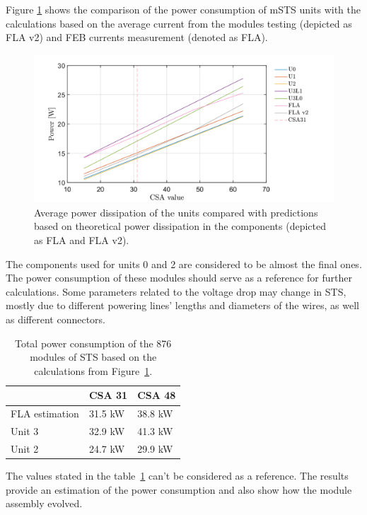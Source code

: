 Figure \ref{fig_theor} shows the comparison of the power consumption of \gls{mSTS} units with the calculations based on the average current from the modules testing (depicted as FLA v2) and FEB currents measurement (denoted as FLA). 

\begin{figure}[h!]
\centering
\includegraphics[width=0.95\columnwidth]{Chapter6/DCS/images/theor.png}
\caption{Average power dissipation of the units compared with predictions based on theoretical power dissipation in the components (depicted as FLA and FLA v2).} 
\label{fig_theor}
\end{figure}
The components used for units 0 and 2 are considered to be almost the final ones. The power consumption of these modules should serve as a reference for further calculations. Some parameters related to the voltage drop may change in \gls{STS}, mostly due to different powering lines' lengths and diameters of the wires, as well as different connectors. 
\begin{table}[h!]
\caption{Total power consumption of the 876 modules of \gls{STS} based on the calculations from Figure~\ref{fig_theor}.}
\centering
\begin{tabular}{lll}
\hline
               & \gls{CSA} 31  & \gls{CSA} 48  \\ \hline
FLA estimation & 31.5 kW & 38.8 kW \\
Unit 3         & 32.9 kW & 41.3 kW \\
Unit 2         & 24.7 kW & 29.9 kW \\ \hline
\end{tabular}

\label{tab:power_cons}
\end{table}
The values stated in the table~\ref{tab:power_cons} can't be considered as a reference. The results provide an estimation of the power consumption and also show how the module assembly evolved. 
